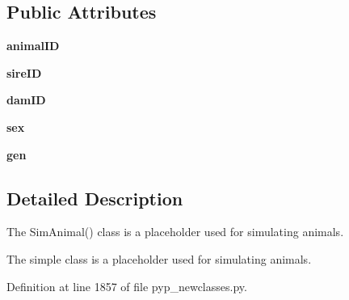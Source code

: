 \subsection*{Public Attributes}
\begin{DoxyCompactItemize}
\item 
\hypertarget{classPyPedal_1_1pyp__newclasses_1_1SimAnimal_a1ea4b52632b8f7196959a33050b70f91}{
{\bfseries animalID}}
\label{classPyPedal_1_1pyp__newclasses_1_1SimAnimal_a1ea4b52632b8f7196959a33050b70f91}

\item 
\hypertarget{classPyPedal_1_1pyp__newclasses_1_1SimAnimal_a14098db938e4814fe6b8cba3d145eb89}{
{\bfseries sireID}}
\label{classPyPedal_1_1pyp__newclasses_1_1SimAnimal_a14098db938e4814fe6b8cba3d145eb89}

\item 
\hypertarget{classPyPedal_1_1pyp__newclasses_1_1SimAnimal_a1d58d1a93972aafa0755f746343e68b6}{
{\bfseries damID}}
\label{classPyPedal_1_1pyp__newclasses_1_1SimAnimal_a1d58d1a93972aafa0755f746343e68b6}

\item 
\hypertarget{classPyPedal_1_1pyp__newclasses_1_1SimAnimal_ab8da5a60230b354cf39f3d543355582c}{
{\bfseries sex}}
\label{classPyPedal_1_1pyp__newclasses_1_1SimAnimal_ab8da5a60230b354cf39f3d543355582c}

\item 
\hypertarget{classPyPedal_1_1pyp__newclasses_1_1SimAnimal_aa5c6d5d0976acd1cf7dbd50663d9ca00}{
{\bfseries gen}}
\label{classPyPedal_1_1pyp__newclasses_1_1SimAnimal_aa5c6d5d0976acd1cf7dbd50663d9ca00}

\end{DoxyCompactItemize}


\subsection{Detailed Description}
The SimAnimal() class is a placeholder used for simulating animals. \begin{DoxyVerb}The simple class is a placeholder used for simulating animals.\end{DoxyVerb}
 

Definition at line 1857 of file pyp\_\-newclasses.py.



